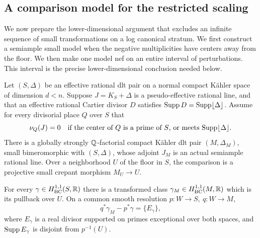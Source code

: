 \subsection{A comparison model for the restricted scaling}

We now prepare the lower-dimensional argument that excludes an
infinite sequence of small transformations on a log canonical
stratum.  We first construct a semiample small model when the
negative multiplicities have centers away from the floor.  We then
make one model nef on an entire interval of perturbations.  This
interval is the precise lower-dimensional conclusion needed below.

\begin{lemma}
\label{prog:stratum-model}
Let \((S,\Delta)\) be an effective rational dlt pair on a normal
compact Kähler space of dimension \(d<n\).  Suppose
\(J=K_S+\Delta\) is a pseudo-effective rational line, and that an
effective rational Cartier divisor \(D\) satisfies
\(\operatorname{Supp} D=\operatorname{Supp}\lfloor\Delta\rfloor\). Assume for every divisorial
place \(Q\) over \(S\) that
\begin{equation}
 \nu_Q(J)=0
 \quad\text{if the center of \(Q\) is a prime of \(S\), or meets
 \(\operatorname{Supp}\lfloor\Delta\rfloor\).}
 \label{prog:away-floor}
\end{equation}
There is a globally strongly \(\mathbb Q\)-factorial compact Kähler dlt
pair \((M,\Delta_M)\), small bimeromorphic with \((S,\Delta)\),
whose adjoint \(J_M\) is an actual semiample rational line.
Over a neighborhood \(U\) of the floor in \(S\), the comparison is
a projective small crepant morphism \(M_U\to U\).

For every \(\gamma\in H^{1,1}_{\mathrm{BC}}(S,\mathbb R)\) there is a transformed
class \(\gamma_M\in H^{1,1}_{\mathrm{BC}}(M,\mathbb R)\) which is its pullback over
\(U\). On a common smooth resolution \(p:W\to S,\ q:W\to M\),
\[
 q^*\gamma_M-p^*\gamma=\{E_\gamma\},
\]
where \(E_\gamma\) is a real divisor supported on primes exceptional over
both spaces, and \(\operatorname{Supp} E_\gamma\) is disjoint from \(p^{-1}(U)\).
\end{lemma}

